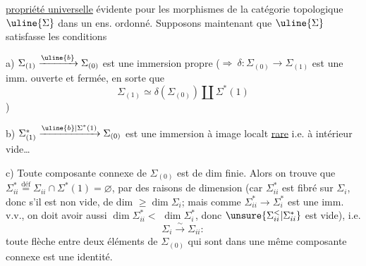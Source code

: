 \uline{propriété universelle} évidente pour les morphismes
de la catégorie topologique $\uline{\Sigma}$ dans un ens. ordonné.
\unsure{\S} Supposons maintenant que $\uline{\Sigma}$ satisfasse les
conditions

a) $\Sigma_{(1)}\xrightarrow{\uline{b}}\Sigma_{(0)}$ est une immersion
propre ($\Longrightarrow\ \delta:\Sigma_{(0)}\longrightarrow\Sigma_{(1)}$ est une imm.
ouverte et fermée, en sorte que 
\[
\Sigma_{(1)}\simeq\delta(\Sigma_{(0)})\amalg\Sigma^{*}(1)
\]
)

b) $\Sigma^{*}_{(1)}\xrightarrow{\uline{b}|\Sigma^{*}(1)}\Sigma_{(0)}$ est une immersion à image
localt \uline{rare} i.e. à intérieur vide\ldots

c) \deleted{\unsure{---}} Toute composante connexe de $\Sigma_{(0)}$ est de
dim finie.
Alors on trouve que $\Sigma_{ii}^{*}\overset{\mathrm{déf}}{=}\Sigma_{ii}\cap\Sigma^{*}(1)=\varnothing$,
par des raisons de dimension (car $\Sigma_{ii}^{*}$ est
fibré sur  $\Sigma_i$, donc s'il est non vide, de
dim $\geq\dim\Sigma_i$; mais comme $\Sigma_{ii}^{*}\longrightarrow\Sigma_i^{*}$ est
une imm. v.v., on doit avoir aussi $\dim\Sigma_{ii}^{*}<$
$\dim\Sigma_i^{*}$, donc $\unsure{\Sigma_{ii}^{<}|\Sigma_{ii}^{*}}$ est vide), i.e.
\[
\boxed{\Sigma_i\xrightarrow{\sim}\Sigma_{ii}}:
\]
toute flèche  entre deux
 éléments de $\Sigma_{(0)}$ qui sont dans une
même composante connexe  est une identité.
